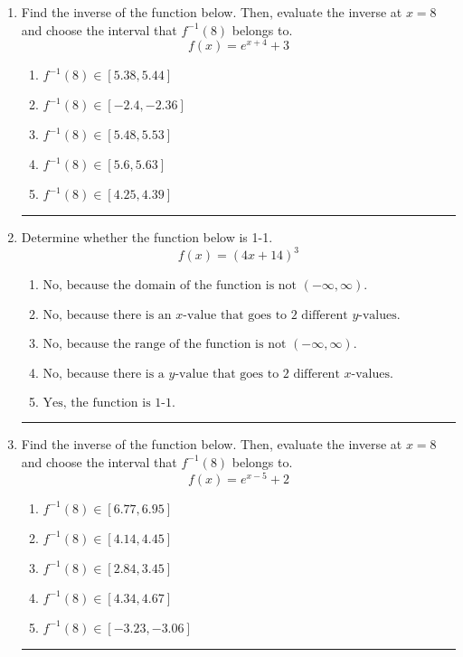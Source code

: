 \documentclass[14pt]{extbook}
\newcommand{\litem}[1]{\item#1\hspace*{-1cm}\rule{\textwidth}{0.4pt}}
\begin{document}
\begin{enumerate}
{\begin{enumerate}[label=\Alph*.]
\end{enumerate} }
\litem{
Find the inverse of the function below. Then, evaluate the inverse at $x = 8$ and choose the interval that $f^{-1}(8)$ belongs to.\[ f(x) = e^{x+4}+3 \]\begin{enumerate}[label=\Alph*.]
\item \( f^{-1}(8) \in [5.38, 5.44] \)
\item \( f^{-1}(8) \in [-2.4, -2.36] \)
\item \( f^{-1}(8) \in [5.48, 5.53] \)
\item \( f^{-1}(8) \in [5.6, 5.63] \)
\item \( f^{-1}(8) \in [4.25, 4.39] \)

\end{enumerate} }
\litem{
Determine whether the function below is 1-1.\[ f(x) = (4 x + 14)^3 \]\begin{enumerate}[label=\Alph*.]
\item \( \text{No, because the domain of the function is not $(-\infty, \infty)$.} \)
\item \( \text{No, because there is an $x$-value that goes to 2 different $y$-values.} \)
\item \( \text{No, because the range of the function is not $(-\infty, \infty)$.} \)
\item \( \text{No, because there is a $y$-value that goes to 2 different $x$-values.} \)
\item \( \text{Yes, the function is 1-1.} \)

\end{enumerate} }
\litem{
Find the inverse of the function below. Then, evaluate the inverse at $x = 8$ and choose the interval that $f^{-1}(8)$ belongs to.\[ f(x) = e^{x-5}+2 \]\begin{enumerate}[label=\Alph*.]
\item \( f^{-1}(8) \in [6.77, 6.95] \)
\item \( f^{-1}(8) \in [4.14, 4.45] \)
\item \( f^{-1}(8) \in [2.84, 3.45] \)
\item \( f^{-1}(8) \in [4.34, 4.67] \)
\item \( f^{-1}(8) \in [-3.23, -3.06] \)

\end{enumerate} }
\end{enumerate}
\end{document}

